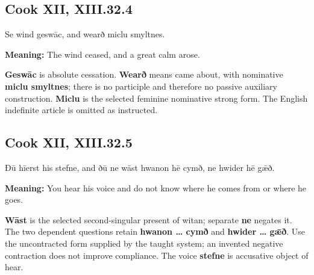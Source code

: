 \par\begin{minipage}{\linewidth}\raggedright
\subsection*{Cook XII, XIII.32.4}

Se wind geswāc, and wearð miclu smyltnes.

\textbf{Meaning:} The wind ceased, and a great calm arose.

\textbf{Geswāc} is absolute cessation. \textbf{Wearð} means came about, with nominative \textbf{miclu smyltnes}; there is no participle and therefore no passive auxiliary construction. \textbf{Miclu} is the selected feminine nominative strong form. The English indefinite article is omitted as instructed.

\end{minipage}\par\addvspace{4pt}

\par\begin{minipage}{\linewidth}\raggedright
\subsection*{Cook XII, XIII.32.5}

Ðū hīerst his stefne, and ðū ne wāst hwanon hē cymð, ne hwider hē gǣð.

\textbf{Meaning:} You hear his voice and do not know where he comes from or where he goes.

\textbf{Wāst} is the selected second-singular present of witan; separate \textbf{ne} negates it. The two dependent questions retain \textbf{hwanon … cymð} and \textbf{hwider … gǣð}. Use the uncontracted form supplied by the taught system; an invented negative contraction does not improve compliance. The voice \textbf{stefne} is accusative object of hear.

\end{minipage}\par\addvspace{4pt}

